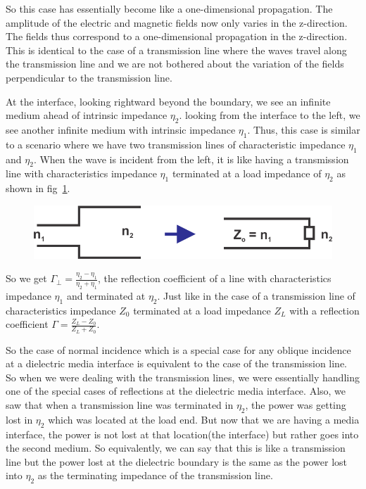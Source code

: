 So this case has essentially become like a one-dimensional propagation. The amplitude of the electric and magnetic fields now only varies in the z-direction. The fields thus correspond to a one-dimensional propagation in the z-direction. This is identical to the case of a transmission line where the waves travel along the transmission line and we are not bothered about the variation of the fields perpendicular to the transmission line.

At the interface, looking rightward beyond the boundary, we see an infinite medium ahead of intrinsic impedance $\eta_{2}$. looking from the interface to the left, we see another infinite medium with intrinsic impedance $\eta_{1}$. Thus, this case is similar to a scenario where we have two transmission lines of characteristic impedance $\eta_{1}$ and $\eta_{2}$. When the wave is incident from the left, it is like having a transmission line with characteristics impedance  $\eta_{1}$ terminated at a load impedance of  $\eta_{2}$ as shown in fig~\ref{fig:17}.
\begin{figure}[h]
\centering
\includegraphics[width=1\linewidth]{graphics/17}
\caption{}
\label{fig:17}
\end{figure}

So we get $\Gamma_{\perp} = \frac{\eta_{2} - \eta_{1}}{\eta_{2} + \eta_{1}}$, the reflection coefficient of a line with characteristics impedance  $\eta_{1}$ and terminated at  $\eta_{2}$. Just like in the case of a transmission line of characteristics impedance $Z_{0}$ terminated at a load impedance $Z_{L}$ with a reflection coefficient $\Gamma = \frac{Z_{L} - Z_{0}}{Z_{L} + Z_{0}}$.

So the case of normal incidence which is a special case for any oblique incidence at a dielectric media interface is equivalent to the case of the transmission line. So when we were dealing with the transmission lines, we were essentially handling one of the special cases of reflections at the dielectric media interface. Also, we saw that when a transmission line was terminated in  $\eta_{2}$, the power was getting lost in  $\eta_{2}$ which was located at the load end. But now that we are having a media interface,  the power is not lost at that location(the interface) but rather goes into the second medium. So equivalently, we can say that this is like a transmission line but the power lost at the dielectric boundary is the same as the power lost into  $\eta_{2}$ as the terminating impedance of the transmission line. 

